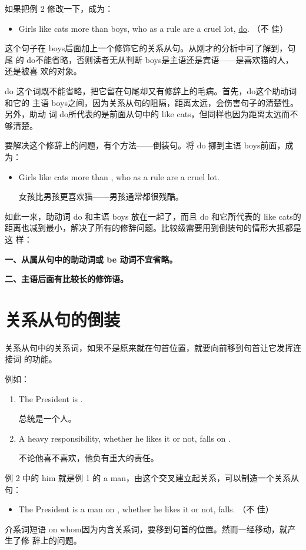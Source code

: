 如果把例 2 修改一下，成为：
\begin{itemize}
\item Girls like cats more than boys, who as a rule are a cruel lot, \ul{do}. （不
  佳）
\end{itemize}
这个句子在 boys后面加上一个修饰它的关系从句。从刚才的分析中可了解到，句尾
的 do不能省略，否则读者无从判断 boys是主语还是宾语——是喜欢猫的人，还是被喜
欢的对象。

do 这个词既不能省略，把它留在句尾却又有修辞上的毛病。首先，do这个助动词和它的
主语 boys之间，因为关系从句的阻隔，距离太远，会伤害句子的清楚性。另外，助动
词 do所代表的是前面从句中的 like cats，但同样也因为距离太远而不够清楚。

要解决这个修辞上的问题，有个方法——倒装句。将 do 挪到主语 boys前面，成为：
\begin{itemize}
\item Girls like cats more than , who as a rule are a cruel lot.

  女孩比男孩更喜欢猫——男孩通常都很残酷。
\end{itemize}

如此一来，助动词 do 和主语 boys 放在一起了，而且 do 和它所代表的 like cats的
距离也减到最小，解决了所有的修辞问题。比较级需要用到倒装句的情形大抵都是这
样：

\textbf{一、从属从句中的助动词或 be 动词不宜省略。}

\textbf{二、主语后面有比较长的修饰语。}

\section{关系从句的倒装}

关系从句中的关系词，如果不是原来就在句首位置，就要向前移到句首让它发挥连接词
的功能。

例如：
\begin{enumerate}
\item The President is .

  总统是一个人。
\item A heavy responsibility, whether he likes it or not, falls on .

  不论他喜不喜欢，他负有重大的责任。
\end{enumerate}
例 2 中的 him 就是例 1 的 a man，由这个交叉建立起关系，可以制造一个关系从句：
\begin{itemize}
\item The President is a man on  , whether he likes it or not, falls. （不
  佳）
\end{itemize}
介系词短语 on whom因为内含关系词，要移到句首的位置。然而一经移动，就产生了修
辞上的问题。

